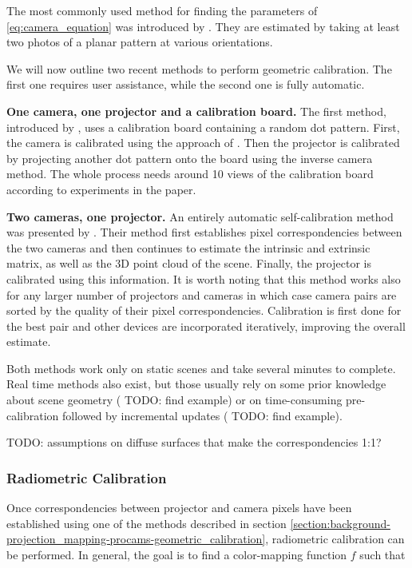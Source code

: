 The most commonly used method for finding the parameters of \ref{eq:camera_equation} was introduced by \citet{Zhang1999}. They are estimated by taking at least two photos of a planar pattern at various orientations.

We will now outline two recent methods to perform geometric calibration. The first one requires user assistance, while the second one is fully automatic.

\textbf{One camera, one projector and a calibration board.} The first method, introduced by \citet{Yang2016}, uses a calibration board containing a random dot pattern. First, the camera is calibrated using the approach of \citet{Zhang1999}. Then the projector is calibrated by projecting another dot pattern onto the board using the inverse camera method. The whole process needs around 10 views of the calibration board according to experiments in the paper.

\textbf{Two cameras, one projector.} An entirely automatic self-calibration method was presented by \citet{Willi2017}. Their method first establishes pixel correspondencies between the two cameras and then continues to estimate the intrinsic and extrinsic matrix, as well as the 3D point cloud of the scene. Finally, the projector is calibrated using this information. It is worth noting that this method works also for any larger number of projectors and cameras in which case camera pairs are sorted by the quality of their pixel correspondencies. Calibration is first done for the best pair and other devices are incorporated iteratively, improving the overall estimate.

Both methods work only on static scenes and take several minutes to complete. Real time methods also exist, but those usually rely on some prior knowledge about scene geometry ({\color{red} TODO: find example}) or on time-consuming pre-calibration followed by incremental updates ({\color{red} TODO: find example}).

{\color{red} TODO: assumptions on diffuse surfaces that make the correspondencies 1:1?}

\subsubsection{Radiometric Calibration}
\label{section:background-projection_mapping-procams-radiometric_calibration}

Once correspondencies between projector and camera pixels have been established using one of the methods described in section \ref{section:background-projection_mapping-procams-geometric_calibration}, radiometric calibration can be performed. In general, the goal is to find a color-mapping function \(f\) such that

